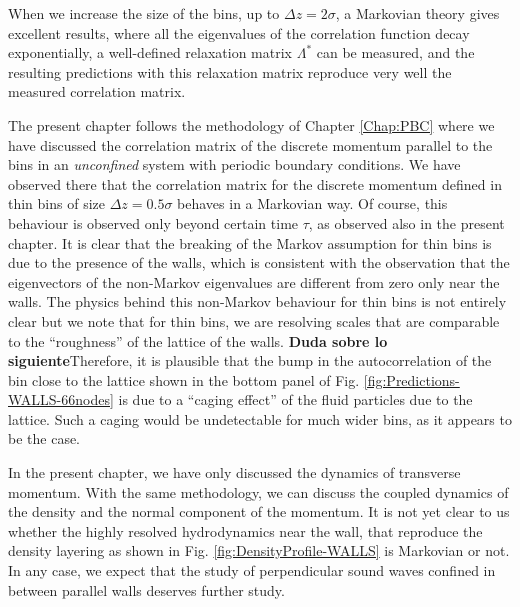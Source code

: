 \documentclass[b5paper,openright,10pt]{book}
\newcommand{\Note}[1]{{\bf \color{red}#1}}    %
\begin{document}
When we  increase the  size of  the bins, up  to $\Delta  z=2\sigma$, a
Markovian theory gives excellent results, where all the eigenvalues of
the   correlation  function   decay   exponentially,  a   well-defined
relaxation  matrix  $\Lambda^*$ can  be  measured,  and the  resulting
predictions  with  this  relaxation  matrix reproduce  very  well  the
measured correlation matrix.

The present chapter follows the  methodology of Chapter \ref{Chap:PBC}  where we
have  discussed  the  correlation  matrix  of  the  discrete  momentum
parallel to  the bins in  an \textit{unconfined} system  with periodic
boundary  conditions.  We  have  observed there  that the  correlation
matrix for the discrete momentum defined  in thin bins of size $\Delta
z= 0.5\sigma$ behaves in a Markovian way. Of course, this behaviour is
observed  only beyond  certain time  $\tau$, as  observed also  in the
present chapter.  It is clear that the breaking of the Markov assumption
for thin bins is due to the presence of the walls, which is consistent
with  the   observation  that  the  eigenvectors   of  the  non-Markov
eigenvalues are different  from zero only near the  walls. The physics
behind this non-Markov  behaviour for thin bins is  not entirely clear
but  we note  that for  thin bins,  we are  resolving scales  that are
comparable   to   the   ``roughness''    of   the   lattice   of   the
walls. \Note{Duda sobre lo siguiente}Therefore, it is plausible that the bump in the autocorrelation
of the  bin close  to the lattice  shown in the  bottom panel  of Fig.
\ref{fig:Predictions-WALLS-66nodes} is  due to a  ``caging effect'' of the  fluid particles 
due to the lattice. Such a caging would be undetectable for much wider
bins, as it appears to be the case.

In  the  present  chapter,  we  have  only  discussed  the  dynamics  of
transverse momentum.   With the same  methodology, we can  discuss the
coupled  dynamics of  the  density  and the  normal  component of  the
momentum.   It is  not yet  clear to  us whether  the highly  resolved
hydrodynamics near  the wall, that  reproduce the density  layering as
shown in  Fig.  \ref{fig:DensityProfile-WALLS} is  Markovian or  not. In any  case, we
expect that the study of perpendicular sound waves confined in between
parallel walls deserves further study.
\end{document}
